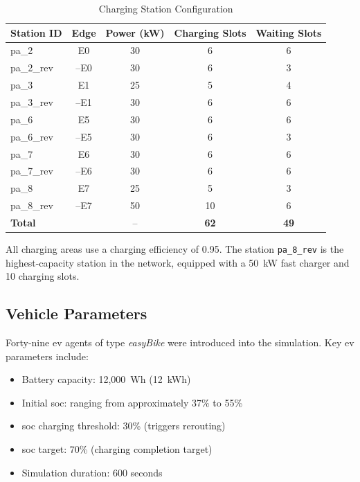 \documentclass{thesis-library}
\begin{document}
\begin{table}[htbp]
\caption{Charging Station Configuration}
\label{tab:stations}
\begin{center}
\begin{tabular}{|l|c|c|c|c|}
\hline
\textbf{Station ID} & \textbf{Edge} & \textbf{Power (kW)} & \textbf{Charging Slots} & \textbf{Waiting Slots} \\
\hline
pa\_2          & E0    & 30 & 6  & 6 \\
pa\_2\_rev     & --E0  & 30 & 6  & 3 \\
pa\_3          & E1    & 25 & 5  & 4 \\
pa\_3\_rev     & --E1  & 30 & 6  & 6 \\
pa\_6          & E5    & 30 & 6  & 6 \\
pa\_6\_rev     & --E5  & 30 & 6  & 3 \\
pa\_7          & E6    & 30 & 6  & 6 \\
pa\_7\_rev     & --E6  & 30 & 6  & 6 \\
pa\_8          & E7    & 25 & 5  & 3 \\
pa\_8\_rev     & --E7  & 50 & 10 & 6 \\
\hline
\multicolumn{2}{|l|}{\textbf{Total}} & -- & \textbf{62} & \textbf{49} \\
\hline
\end{tabular}
\end{center}
\end{table}

All charging areas use a charging efficiency of 0.95. The station \texttt{pa\_8\_rev}
is the highest-capacity station in the network, equipped with a 50~kW fast charger and
10 charging slots.

\subsection{Vehicle Parameters}

Forty-nine \Gls{ev} agents of type \textit{easyBike} were introduced into the simulation.
Key \Gls{ev} parameters include:

\begin{itemize}
  \item Battery capacity: 12,000~Wh (12~kWh)
  \item Initial \Gls{soc}: ranging from approximately 37\% to 55\%
  \item \Gls{soc} charging threshold: 30\% (triggers rerouting)
  \item \Gls{soc} target: 70\% (charging completion target)
  \item Simulation duration: 600 seconds
\end{itemize}
\end{document}
